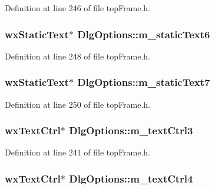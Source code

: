 Definition at line 246 of file top\-Frame.\-h.

\hypertarget{class_dlg_options_a4fdffe00b1d96ef3bf333ddf5fe05bb6}{
\subsubsection[{m\-\_\-static\-Text6}]{\setlength{\rightskip}{0pt plus 5cm}wx\-Static\-Text$\ast$ Dlg\-Options\-::m\-\_\-static\-Text6\hspace{0.3cm}{\ttfamily [protected]}}}\label{class_dlg_options_a4fdffe00b1d96ef3bf333ddf5fe05bb6}


Definition at line 248 of file top\-Frame.\-h.

\hypertarget{class_dlg_options_a1d6d4b2a70e0eb5d1a998da2e5ea86c0}{
\subsubsection[{m\-\_\-static\-Text7}]{\setlength{\rightskip}{0pt plus 5cm}wx\-Static\-Text$\ast$ Dlg\-Options\-::m\-\_\-static\-Text7\hspace{0.3cm}{\ttfamily [protected]}}}\label{class_dlg_options_a1d6d4b2a70e0eb5d1a998da2e5ea86c0}


Definition at line 250 of file top\-Frame.\-h.

\hypertarget{class_dlg_options_a98a1eaa6e551674e04f9f5a52a4cd786}{
\subsubsection[{m\-\_\-text\-Ctrl3}]{\setlength{\rightskip}{0pt plus 5cm}wx\-Text\-Ctrl$\ast$ Dlg\-Options\-::m\-\_\-text\-Ctrl3\hspace{0.3cm}{\ttfamily [protected]}}}\label{class_dlg_options_a98a1eaa6e551674e04f9f5a52a4cd786}


Definition at line 241 of file top\-Frame.\-h.

\hypertarget{class_dlg_options_a7b33a3a320a8f5cbce3eff97268ebc5d}{
\subsubsection[{m\-\_\-text\-Ctrl4}]{\setlength{\rightskip}{0pt plus 5cm}wx\-Text\-Ctrl$\ast$ Dlg\-Options\-::m\-\_\-text\-Ctrl4\hspace{0.3cm}{\ttfamily [protected]}}}\label{class_dlg_options_a7b33a3a320a8f5cbce3eff97268ebc5d}


